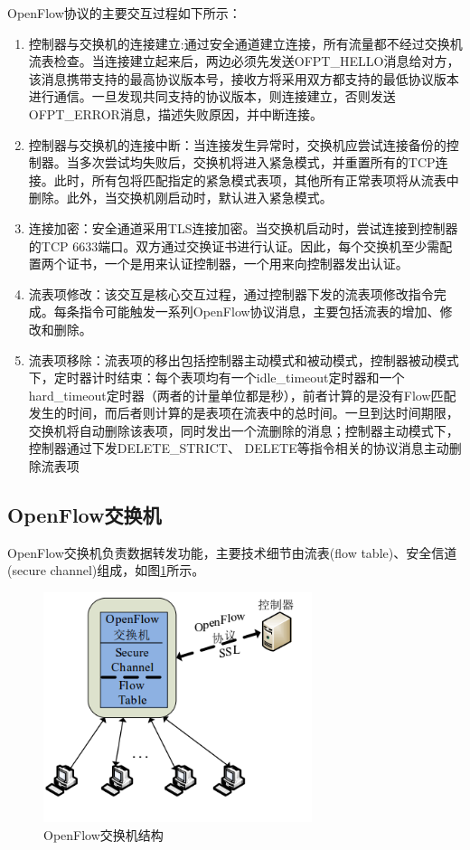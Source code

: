 OpenFlow协议的主要交互过程如下所示：

\begin{enumerate}
\item 控制器与交换机的连接建立:通过安全通道建立连接，所有流量都不经过交换机流表检查。当连接建立起来后，两边必须先发送OFPT\_HELLO消息给对方，该消息携带支持的最高协议版本号，接收方将采用双方都支持的最低协议版本进行通信。一旦发现共同支持的协议版本，则连接建立，否则发送OFPT\_ERROR消息，描述失败原因，并中断连接。
\item 控制器与交换机的连接中断：当连接发生异常时，交换机应尝试连接备份的控制器。当多次尝试均失败后，交换机将进入紧急模式，并重置所有的TCP连接。此时，所有包将匹配指定的紧急模式表项，其他所有正常表项将从流表中删除。此外，当交换机刚启动时，默认进入紧急模式。
\item 连接加密：安全通道采用\gls*{TLS}连接加密。当交换机启动时，尝试连接到控制器的TCP 6633端口。双方通过交换证书进行认证。因此，每个交换机至少需配置两个证书，一个是用来认证控制器，一个用来向控制器发出认证。
\item 流表项修改：该交互是核心交互过程，通过控制器下发的流表项修改指令完成。每条指令可能触发一系列OpenFlow协议消息，主要包括流表的增加、修改和删除。
\item 流表项移除：流表项的移出包括控制器主动模式和被动模式，控制器被动模式下，定时器计时结束：每个表项均有一个idle\_timeout定时器和一个hard\_timeout定时器（两者的计量单位都是秒），前者计算的是没有Flow匹配发生的时间，而后者则计算的是表项在流表中的总时间。一旦到达时间期限，交换机将自动删除该表项，同时发出一个流删除的消息；控制器主动模式下，控制器通过下发DELETE\_STRICT、 DELETE等指令相关的协议消息主动删除流表项
\end{enumerate}

\subsection{OpenFlow交换机}
OpenFlow交换机负责数据转发功能，主要技术细节由流表(flow table)、安全信道(secure channel)组成\cite{openflow-1}，如图\ref{fig:of-switch}所示。

\begin{figure}[!htb]
  \centering
  \includegraphics[width=0.7\textwidth]{logo/of-switch.png}
  \caption{OpenFlow交换机结构}
  \label{fig:of-switch}
\end{figure}

